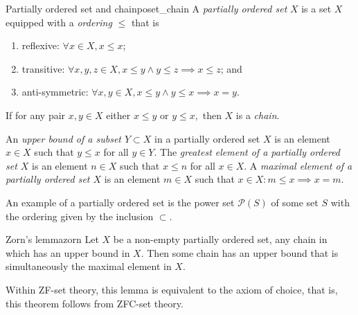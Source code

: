 \begin{definition}{Partially ordered set and chain}{poset_chain}
    A \emph{partially ordered set} \(X\) is a set \(X\) equipped with a \emph{ordering} \(\leq\) that is
    \begin{enumerate}[label=(\alph*)]
        \item reflexive: \(\forall x \in X, x \leq x\);
        \item transitive: \(\forall x,y,z \in X, x \leq y \land y \leq z \implies x \leq z\); and
        \item anti-symmetric: \(\forall x, y\in X, x \leq y \land y \leq x \implies x = y\).
    \end{enumerate}
    If for any pair \(x, y \in X\) either \(x \leq y\) or \(y \leq x,\) then \(X\) is a \emph{chain}.

    An \emph{upper bound of a subset \(Y \subset X\)} in a partially ordered set \(X\) is an element \(x \in X\) such that \(y \leq x\) for all \(y \in Y.\) The \emph{greatest element of a partially ordered set \(X\)} is an element \(n \in X\) such that \(x \leq n\) for all \(x \in X\). A \emph{maximal element of a partially ordered set \(X\)} is an element \(m \in X\) such that \(x \in X : m \leq x \implies x = m\).
\end{definition}
\begin{example}
    An example of a partially ordered set is the power set \(\mathcal{P}(S)\) of some set \(S\) with the ordering given by the inclusion \(\subset\).
\end{example}

\begin{theorem}{Zorn's lemma}{zorn}
    Let \(X\) be a non-empty partially ordered set, any chain in which has an upper bound in \(X\). Then some chain has an upper bound that is simultaneously the maximal element in \(X\).
\end{theorem}
\begin{remark}
    Within ZF-set theory, this lemma is equivalent to the axiom of choice, that is, this theorem follows from ZFC-set theory.
\end{remark}

